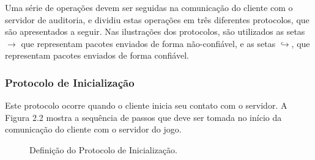 Uma série de operações devem ser seguidas na comunicação do cliente com o servidor de auditoria, e \cite{NVE} dividiu estas operações em três diferentes protocolos, que são apresentados a seguir. Nas ilustrações dos protocolos, são utilizados as setas $\rightarrow$ que representam pacotes enviados de forma não-confiável, e as setas $\hookrightarrow$, que representam pacotes enviados de forma confiável.

\subsubsection{Protocolo de Inicialização}
\label{protocoloinicializacao}

Este protocolo ocorre quando o cliente inicia seu contato com o servidor. A Figura 2.2 mostra a sequência de passos que deve ser tomada no início da comunicação do cliente com o servidor do jogo.

\begin{figure}[h!]
	\begin{center}

	\end{center}
	\caption[Definição do Protocolo de Inicialização.]{Definição do Protocolo de Inicialização.}
	\label{fig:inicializar}	
	
\end{figure}

